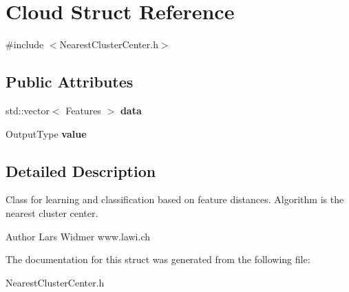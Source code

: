 \hypertarget{structCloud}{
\section{Cloud Struct Reference}
\label{structCloud}
}


{\ttfamily \#include $<$NearestClusterCenter.h$>$}\subsection*{Public Attributes}
\begin{DoxyCompactItemize}
\item 
\hypertarget{structCloud_a5510f0372a93a85db32abf4161dc9123}{
std::vector$<$ Features $>$ {\bfseries data}}
\label{structCloud_a5510f0372a93a85db32abf4161dc9123}

\item 
\hypertarget{structCloud_ac7dc0d2900d6b86cfee3a35d40f60dcc}{
OutputType {\bfseries value}}
\label{structCloud_ac7dc0d2900d6b86cfee3a35d40f60dcc}

\end{DoxyCompactItemize}


\subsection{Detailed Description}
Class for learning and classification based on feature distances. Algorithm is the nearest cluster center. \begin{DoxyAuthor}{Author}
Lars Widmer www.lawi.ch 
\end{DoxyAuthor}


The documentation for this struct was generated from the following file:\begin{DoxyCompactItemize}
\item 
NearestClusterCenter.h\end{DoxyCompactItemize}

